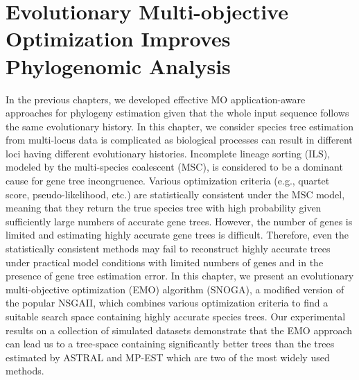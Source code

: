 \graphicspath{{snoga/}}
\chapter{Evolutionary Multi-objective Optimization Improves Phylogenomic Analysis} \label{ch:snoga}

	In the previous chapters, we developed effective MO application-aware approaches for phylogeny estimation given that the whole input sequence follows the same evolutionary history.
	In this chapter, we consider species tree estimation from multi-locus data is complicated as biological processes can result in different loci having different evolutionary histories. Incomplete lineage sorting (ILS), modeled by the multi-species coalescent (MSC), is considered to be a dominant cause for gene tree incongruence. Various optimization criteria (e.g., quartet score, pseudo-likelihood, etc.) are statistically consistent under the MSC model, meaning that they return the true species tree with high probability given sufficiently large numbers of accurate gene trees. However, the number of genes is limited and estimating highly accurate gene trees is difficult. Therefore, even the statistically consistent methods may fail to reconstruct highly accurate trees under practical model conditions with limited numbers of genes and in the presence of gene tree estimation error. In this chapter, we present an evolutionary multi-objective optimization (EMO) algorithm (SNOGA), a modified version of the popular NSGAII, which combines various optimization criteria to find a suitable search space containing highly accurate species trees. Our experimental results on a collection of simulated datasets demonstrate that the EMO approach can lead us to a tree-space containing significantly better trees than the trees estimated by ASTRAL and MP-EST which are two of the most widely used methods. 

